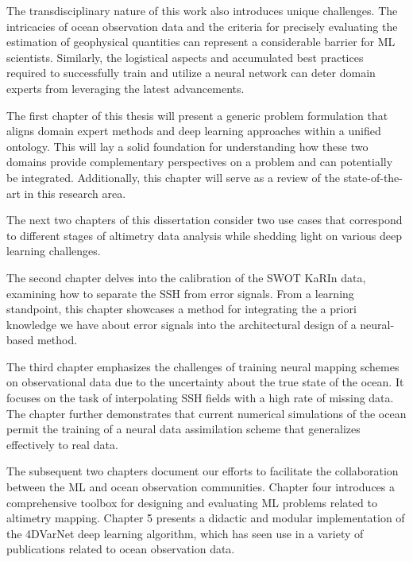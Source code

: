 \begin{bibunit}
The transdisciplinary nature of this work also introduces unique challenges. The intricacies of ocean observation data and the criteria for precisely evaluating the estimation of geophysical quantities can represent a considerable barrier for ML scientists. Similarly, the logistical aspects and accumulated best practices required to successfully train and utilize a neural network can deter domain experts from leveraging the latest advancements.

The first chapter of this thesis will present a generic problem formulation that aligns domain expert methods and deep learning approaches within a unified ontology. This will lay a solid foundation for understanding how these two domains provide complementary perspectives on a problem and can potentially be integrated. Additionally, this chapter will serve as a review of the state-of-the-art in this research area.

The next two chapters of this dissertation consider two use cases that correspond to different stages of altimetry data analysis while shedding light on various deep learning challenges.

The second chapter delves into the calibration of the SWOT KaRIn data, examining how to separate the SSH from error signals. From a learning standpoint, this chapter showcases a method for integrating the a priori knowledge we have about error signals into the architectural design of a neural-based method.

The third chapter emphasizes the challenges of training neural mapping schemes on observational data due to the uncertainty about the true state of the ocean. It focuses on the task of interpolating SSH fields with a high rate of missing data. The chapter further demonstrates that current numerical simulations of the ocean permit the training of a neural data assimilation scheme that generalizes effectively to real data.

The subsequent two chapters document our efforts to facilitate the collaboration between the ML and ocean observation communities. Chapter four introduces a comprehensive toolbox for designing and evaluating ML problems related to altimetry mapping. Chapter 5 presents a didactic and modular implementation of the 4DVarNet deep learning algorithm, which has seen use in a variety of publications related to ocean observation data.


\end{bibunit}


